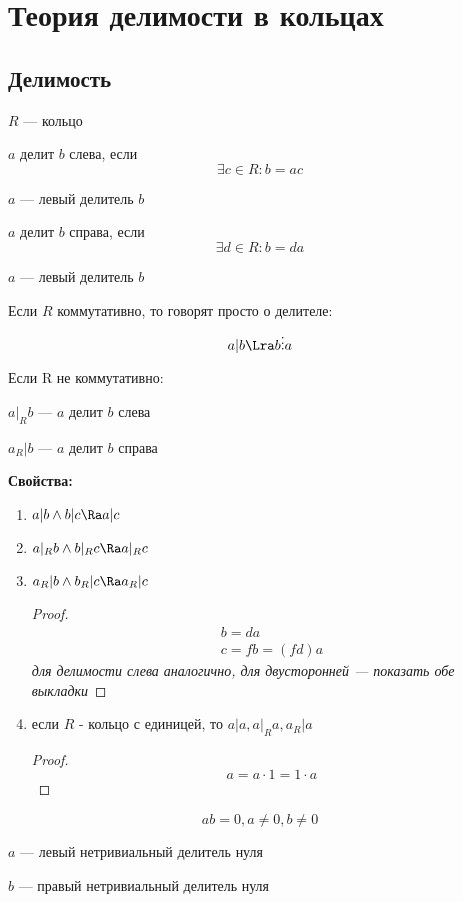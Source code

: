 \chapter{Теория делимости в кольцах}

\section{Делимость}
$R$ --- кольцо

\begin{Def}
	$a$ делит $b$ слева, если \[  \exists c \in R \colon b = ac \]
	
	$a$ --- левый делитель $b$
\end{Def}

\begin{Def}
	$a$ делит $b$ справа, если \[ \exists d \in R \colon b = da \]
	
	$a$ --- левый делитель $b$
\end{Def}

Если $R$ коммутативно, то говорят просто о делителе:
$$ a | b \Lra  b \vdots a $$

Если R не коммутативно:

$a|_R b$ --- $a$ делит $b$ слева

$a_R | b$ --- $a$ делит $b$ справа

\textbf{Свойства:}
\begin{enumerate}
	\item $a | b \wedge b | c \Ra a | c$
	\item $a |_R b \wedge b |_R c \Ra a |_R c$
	\item $a_R | b \wedge  b_R | c \Ra a_R | c$
	\begin{proof}
		\begin{gather*}
			 b = da \\
			 c = fb = (fd)a
		\end{gather*}
		\textit{для делимости слева аналогично, для двусторонней --- показать обе выкладки}
	\end{proof}
	\item 	если $R$ - кольцо с единицей, то $a | a, a |_R a, a_R | a$
	\begin{proof}
		\[ a = a \cdot 1 = 1 \cdot a \]
	\end{proof}
\end{enumerate}

\begin{Def}
	\[ ab = 0, a \neq 0 ,b \neq 0 \]
	
	$a$ --- левый нетривиальный делитель нуля

	$b$ --- правый нетривиальный делитель нуля
\end{Def}

